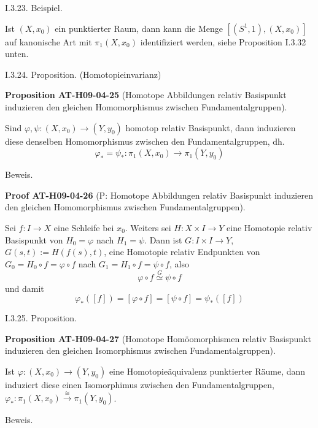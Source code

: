 \documentclass[10pt, letterpaper]{article}
\newcommand{\CustomHeading}[3]{%
  \par\medskip\noindent%
  \textbf{#1 #2} \textnormal{(#3)}.\enskip%
}
\newenvironment{PROP}[2]{\begin{unitbox}\CustomHeading{Proposition}{#1}{#2}}{\end{unitbox}}
\newenvironment{PROOF}[2]{\begin{unitbox}\CustomHeading{Proof}{#1}{#2}}{\end{unitbox}}
\begin{document}
I.3.23. Beispiel. 


Ist $(X, x_{0})$ ein punktierter Raum, dann kann die Menge $\left[\left(S^{1}, 1\right),\left(X, x_{0}\right)\right]$ auf kanonische Art mit $\pi_{1}\left(X, x_{0}\right)$ identifiziert werden, siehe Proposition I.3.32 unten.




I.3.24. Proposition. (Homotopieinvarianz) 

\begin{PROP}{AT-H09-04-25}{Homotope Abbildungen relativ Basispunkt induzieren den gleichen Homomorphismus zwischen Fundamentalgruppen}
Sind $\varphi, \psi:\left(X, x_{0}\right) \rightarrow\left(Y, y_{0}\right)$ homotop relativ Basispunkt, dann induzieren diese denselben Homomorphismus zwischen den Fundamentalgruppen, dh. 
$$\varphi_{*}=\psi_{*}: \pi_{1}\left(X, x_{0}\right) \rightarrow \pi_{1}\left(Y, y_{0}\right)$$
\end{PROP}


Beweis. 

\begin{PROOF}{AT-H09-04-26}{P: Homotope Abbildungen relativ Basispunkt induzieren den gleichen Homomorphismus zwischen Fundamentalgruppen}
Sei $f: I \rightarrow X$ eine Schleife bei $x_{0}$. Weiters sei $H: X \times I \rightarrow Y$ eine Homotopie relativ Basispunkt von $H_{0}=\varphi$ nach $H_{1}=\psi$. Dann ist $G: I \times I \rightarrow Y$, $G(s, t):=H(f(s), t)$, eine Homotopie relativ Endpunkten von $G_{0}=H_{0} \circ f=\varphi \circ f$ nach $G_{1}=H_{1} \circ f=\psi \circ f$, also 
$$\varphi \circ f \stackrel{G}{\simeq} \psi \circ f$$ 
und damit 
$$\varphi_{*}([f])=[\varphi \circ f]=[\psi \circ f]=\psi_{*}([f])$$
\end{PROOF}



I.3.25. Proposition. 


\begin{PROP}{AT-H09-04-27}{Homotope Homöomorphismen relativ Basispunkt induzieren den gleichen Isomorphismus zwischen Fundamentalgruppen}
Ist $\varphi:\left(X, x_{0}\right) \rightarrow\left(Y, y_{0}\right)$ eine Homotopieäquivalenz punktierter Räume, dann induziert diese einen Isomorphimus zwischen den Fundamentalgruppen, $\varphi_{*}: \pi_{1}\left(X, x_{0}\right) \stackrel{\cong}{\rightarrow} \pi_{1}\left(Y, y_{0}\right)$.
\end{PROP}

Beweis. 
\end{document}

